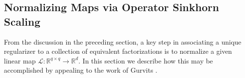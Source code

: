 \documentclass[11pt,letterpaper]{article}
\newcommand{\R}{\mathbb{R}}
\renewcommand{\L}{\mathcal{L}}
\newcommand{\M}{\mathcal{M}}
\begin{document}
%

\subsection{Normalizing Maps via Operator Sinkhorn Scaling} \label{sec:algorithm_normalization}
From the discussion in the preceding section, a key step in associating a unique regularizer to a collection of equivalent factorizations is to normalize a given linear map $\L : \R^{q \times q} \rightarrow \R^d$.  In this section we describe how this may be accomplished by appealing to the work of Gurvits \cite{Gur:04}.
\end{document}
